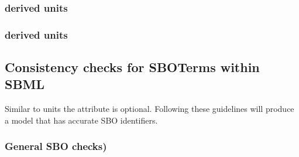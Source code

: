 \begin{sbmlenum}

\end{sbmlenum} \subsubsection*{ derived units} \begin{sbmlenum}


\end{sbmlenum} \subsubsection*{ derived units} \begin{sbmlenum}


\end{sbmlenum}

\subsection{Consistency checks for SBOTerms within SBML}

Similar to units the  attribute is optional.  Following these
guidelines will produce a model that has accurate SBO identifiers.

\subsubsection*{General SBO checks)} \begin{sbmlenum}


\end{sbmlenum}
